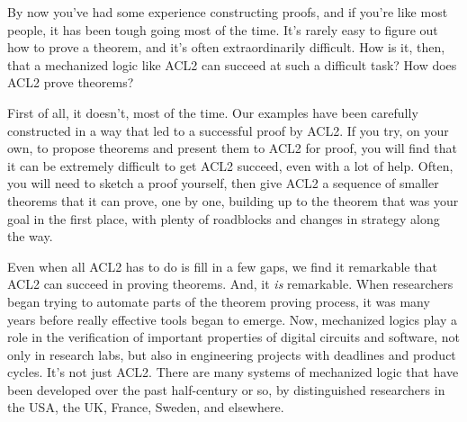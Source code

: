By now you've had some experience constructing proofs, and if you're like most people,
it has been tough going most of the time.
It's rarely easy to figure out how to prove a theorem,
and it's often extraordinarily difficult.
How is it, then, that a mechanized logic like ACL2 can succeed at such a difficult task?
How does ACL2 prove theorems?

First of all, it doesn't, most of the time.
Our examples have been carefully constructed in a way that
led to a successful proof by ACL2.
If you try, on your own, to propose theorems
and present them to ACL2 for proof, you will find that it can be
extremely difficult to get ACL2 succeed, even with a lot of help.
Often, you will need to sketch a proof yourself,
then give ACL2 a sequence of smaller theorems
that it can prove, one by one, building up to
the theorem that was your goal in the first place,
with plenty of roadblocks and changes in strategy along the way.

Even when all ACL2 has to do is fill in a few gaps,
we find it remarkable that ACL2 can succeed in proving theorems.
And, it \emph{is} remarkable.
When researchers began trying to automate parts
of the theorem proving process, it was many years
before really effective tools began to emerge.
Now, mechanized logics play a role in
the verification of important properties of digital circuits and
software, not only in research labs,
but also in engineering projects with deadlines and product cycles.
It's not just ACL2. There are many systems of mechanized logic that
have been developed over the past half-century or so,
by distinguished researchers in the USA, the UK, France, Sweden, and elsewhere.

